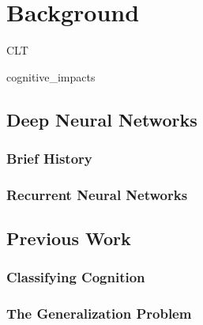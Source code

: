 \chapter{Background}

{CLT}

{cognitive_impacts}


\section{Deep Neural Networks}
\subsection{Brief History}
\subsection{Recurrent Neural Networks}

\section{Previous Work}
\subsection{Classifying Cognition}
\subsection{The Generalization Problem}